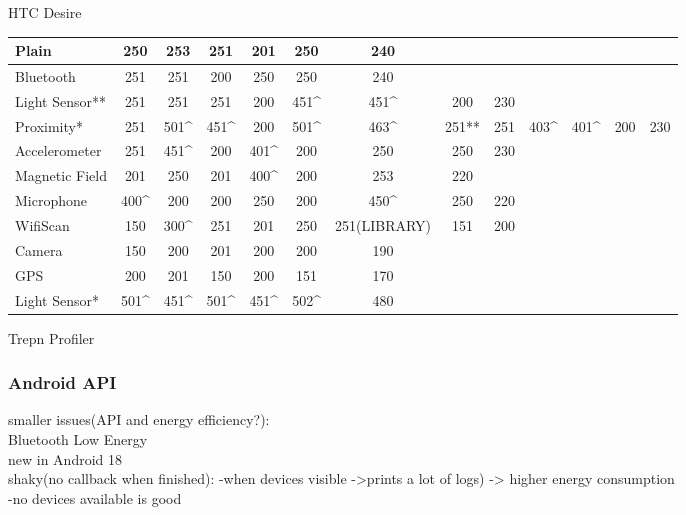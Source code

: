 	HTC Desire\\
	\begin{table}
    \begin{tabular}{| l | c | c | c | c | c | c | c | c | c | c | c | c |}
    \hline
    Plain          & 250  & 253  & 251  & 201  & 250  & 240          & ~     & ~   & ~    & ~    & ~   & ~   \\\hline
    Bluetooth      & 251  & 251  & 200  & 250  & 250  & 240          & ~     & ~   & ~    & ~    & ~   & ~   \\\hline
    Light Sensor** & 251  & 251  & 251  & 200  & 451\^ & 451\^        & 200   & 230 & ~    & ~    & ~   & ~   \\ \hline
    Proximity*     & 251  & 501\^ & 451\^ & 200  & 501\^ & 463\^        & 251** & 251 & 403\^ & 401\^ & 200 & 230 \\ \hline
    Accelerometer  & 251  & 451\^ & 200  & 401\^ & 200  & 250          & 250   & 230 & ~    & ~    & ~   & ~   \\ \hline
    Magnetic Field & 201  & 250  & 201  & 400\^ & 200  & 253          & 220   & ~   & ~    & ~    & ~   & ~   \\ \hline
    Microphone     & 400\^ & 200  & 200  & 250  & 200  & 450\^        & 250   & 220 & ~    & ~    & ~   & ~   \\ \hline
    WifiScan       & 150  & 300\^ & 251  & 201  & 250  & 251(LIBRARY) & 151   & 200 & ~    & ~    & ~   & ~   \\ \hline
    Camera         & 150  & 200  & 201  & 200  & 200  & 190          & ~     & ~   & ~    & ~    & ~   & ~   \\ \hline
    GPS            & 200  & 201  & 150  & 200  & 151  & 170          & ~     & ~   & ~    & ~    & ~   & ~   \\ \hline
    Light Sensor*  & 501\^ & 451\^ & 501\^ & 451\^ & 502\^ & 480          & ~     & ~   & ~    & ~    & ~   & ~   \\ \hline
    \end{tabular}
\end{table}


	Trepn Profiler\\

\subsubsection{Android API}
smaller issues(API and energy efficiency?):\\
	Bluetooth Low Energy\\
		new in Android 18\\
		shaky(no callback when finished):
			-when devices visible ->prints a lot of logs) -> higher energy consumption\\
			-no devices available is good
		
